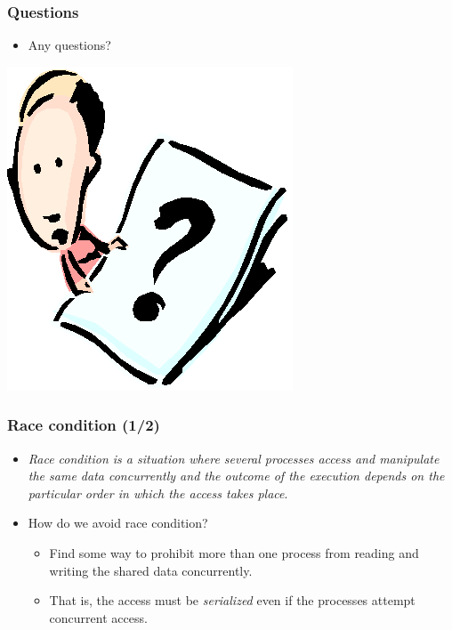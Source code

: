 \documentclass[CJKutf8,xcolor=pdftex,dvipsnames,table]{beamer}
\begin{document}
\begin{CJK*}{UTF8}{song}
  \begin{frame}
  \frametitle{Questions}
  \begin{itemize}
  \item{Any questions?}
  \end{itemize}
  \begin{center}
    \includegraphics[scale=.5]{question}
  \end{center}
  \end{frame}

  \begin{frame}
  \frametitle{Race condition (1/2)} \pause
  \begin{itemize}
  \item{\emph{Race condition is a situation where several processes access and manipulate the same data concurrently and the outcome of the execution depends on the particular order in which the access takes place}.} \pause
  \item{How do we avoid race condition?} \pause
    \begin{itemize}
    \item{Find some way to prohibit more than one process from reading and writing the shared data concurrently.} \pause
    \item{That is, the access must be \emph{serialized} even if the processes attempt concurrent access.}
    \end{itemize}
  \end{itemize}
  \end{frame}


\end{CJK*}
\end{document}
